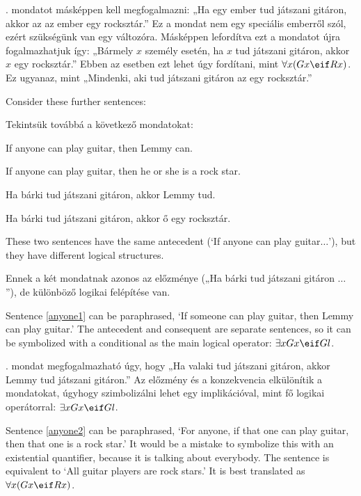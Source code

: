 . mondatot másképpen kell megfogalmazni: „Ha egy ember tud játszani gitáron, akkor az az ember egy rocksztár.” Ez a mondat nem egy speciális emberről szól, ezért szükségünk van egy változóra. Másképpen lefordítva ezt a mondatot újra fogalmazhatjuk így: „Bármely $x$ személy esetén, ha $x$ tud játszani gitáron, akkor $x$ egy rocksztár.” Ebben az esetben ezt lehet úgy fordítani, mint $\forall x (Gx \eif Rx)$. Ez ugyanaz, mint „Mindenki, aki tud játszani gitáron az egy rocksztár.”


Consider these further sentences:

Tekintsük továbbá a következő mondatokat:


\begin{earg}
\item[\ex{anyone1}] If anyone can play guitar, then Lemmy can.
\item[\ex{anyone2}] If anyone can play guitar, then he or she is a rock star.
\end{earg}

\begin{earg}
\item[\ex{anyone1}] Ha bárki tud játszani gitáron, akkor Lemmy tud.
\item[\ex{anyone2}] Ha bárki tud játszani gitáron, akkor ő egy rocksztár.
\end{earg}

These two sentences have the same antecedent (`If anyone can play guitar$\ldots$'), but they have different logical structures.

Ennek a két mondatnak azonos az előzménye („Ha bárki tud játszani gitáron $\ldots$”), de különböző logikai felépítése van.


Sentence \ref{anyone1} can be paraphrased, `If someone can play guitar, then Lemmy can play guitar.' The antecedent and consequent are separate sentences, so it can be symbolized with a conditional as the main logical operator: $\exists x Gx \eif Gl$.

. mondat megfogalmazható úgy, hogy „Ha valaki tud játszani gitáron, akkor Lemmy tud játszani gitáron.” Az előzmény és a konzekvencia elkülönítik a mondatokat, úgyhogy szimbolizálni lehet egy implikációval, mint fő logikai operátorral: $\exists x Gx \eif Gl$.


Sentence \ref{anyone2} can be paraphrased, `For anyone, if that one can play guitar, then that one is a rock star.' It would be a mistake to symbolize this with an existential quantifier, because it is talking about everybody. The sentence is equivalent to `All guitar players are rock stars.' It is best translated as $\forall x(Gx \eif Rx)$.

